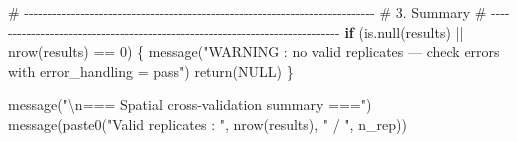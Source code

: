 \documentclass[
  letterpaper,
  DIV=11,
  numbers=noendperiod]{scrartcl}
\newenvironment{Shaded}{\begin{snugshade}}{\end{snugshade}}
\newcommand{\CommentTok}[1]{\textcolor[rgb]{0.37,0.37,0.37}{#1}}
\newcommand{\ConstantTok}[1]{\textcolor[rgb]{0.56,0.35,0.01}{#1}}
\newcommand{\ControlFlowTok}[1]{\textcolor[rgb]{0.00,0.23,0.31}{\textbf{#1}}}
\newcommand{\DecValTok}[1]{\textcolor[rgb]{0.68,0.00,0.00}{#1}}
\newcommand{\FunctionTok}[1]{\textcolor[rgb]{0.28,0.35,0.67}{#1}}
\newcommand{\NormalTok}[1]{\textcolor[rgb]{0.00,0.23,0.31}{#1}}
\newcommand{\SpecialCharTok}[1]{\textcolor[rgb]{0.37,0.37,0.37}{#1}}
\newcommand{\StringTok}[1]{\textcolor[rgb]{0.13,0.47,0.30}{#1}}
\begin{document}
\begin{Shaded}
\begin{Highlighting}[]
  \CommentTok{\# {-}{-}{-}{-}{-}{-}{-}{-}{-}{-}{-}{-}{-}{-}{-}{-}{-}{-}{-}{-}{-}{-}{-}{-}{-}{-}{-}{-}{-}{-}{-}{-}{-}{-}{-}{-}{-}{-}{-}{-}{-}{-}{-}{-}{-}{-}{-}{-}{-}{-}{-}{-}{-}{-}{-}{-}{-}{-}{-}{-}{-}{-}{-}{-}{-}{-}{-}{-}{-}{-}{-}{-}{-}{-}{-}}
  \CommentTok{\# 3. Summary}
  \CommentTok{\# {-}{-}{-}{-}{-}{-}{-}{-}{-}{-}{-}{-}{-}{-}{-}{-}{-}{-}{-}{-}{-}{-}{-}{-}{-}{-}{-}{-}{-}{-}{-}{-}{-}{-}{-}{-}{-}{-}{-}{-}{-}{-}{-}{-}{-}{-}{-}{-}{-}{-}{-}{-}{-}{-}{-}{-}{-}{-}{-}{-}{-}{-}{-}{-}{-}{-}{-}{-}{-}{-}{-}{-}{-}{-}{-}}
  \ControlFlowTok{if}\NormalTok{ (}\FunctionTok{is.null}\NormalTok{(results) }\SpecialCharTok{||} \FunctionTok{nrow}\NormalTok{(results) }\SpecialCharTok{==} \DecValTok{0}\NormalTok{) \{}
    \FunctionTok{message}\NormalTok{(}\StringTok{"WARNING : no valid replicates — check errors with error\_handling = \textquotesingle{}pass\textquotesingle{}"}\NormalTok{)}
    \FunctionTok{return}\NormalTok{(}\ConstantTok{NULL}\NormalTok{)}
\NormalTok{  \}}

  \FunctionTok{message}\NormalTok{(}\StringTok{"}\SpecialCharTok{\textbackslash{}n}\StringTok{=== Spatial cross{-}validation summary ==="}\NormalTok{)}
  \FunctionTok{message}\NormalTok{(}\FunctionTok{paste0}\NormalTok{(}\StringTok{"Valid replicates : "}\NormalTok{, }\FunctionTok{nrow}\NormalTok{(results), }\StringTok{" / "}\NormalTok{, n\_rep))}


\end{Highlighting}
\end{Shaded}
\end{document}
